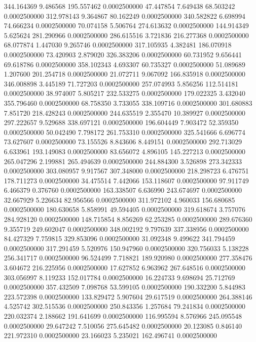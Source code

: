 344.164369 9.486568 195.557462 0.0002500000
47.447854 7.649438 68.503242 0.0002500000
312.978143 9.364867 80.162249 0.0002500000
340.582822 6.698994 74.666234 0.0002500000
70.074158 5.506764 274.613632 0.0002500000
144.914349 5.625624 281.290966 0.0002500000
286.615516 3.721836 216.277368 0.0002500000
68.077874 1.447030 9.265746 0.0002500000
317.105935 4.382481 186.070918 0.0002500000
73.420903 2.879020 326.383206 0.0002500000
60.731952 9.656441 69.618786 0.0002500000
358.102343 4.693307 60.735327 0.0002500000
51.089689 1.207600 201.254718 0.0002500000
21.072711 9.067092 166.835918 0.0002500000
346.008898 3.445189 71.727203 0.0002500000
257.074993 5.856256 112.514181 0.0002500000
38.974007 5.805217 232.533275 0.0002500000
179.022325 3.432040 355.796460 0.0002500000
68.758350 3.733055 338.109716 0.0002500000
301.680883 7.851720 218.428243 0.0002500000
244.635519 2.355470 10.389927 0.0002500000
297.222657 9.529688 338.697121 0.0002500000
196.604449 7.903472 52.359350 0.0002500000
50.042490 7.798172 261.753310 0.0002500000
325.541666 6.696774 73.627607 0.0002500000
73.155526 8.843606 8.449151 0.0002500000
292.713029 6.633961 193.149083 0.0002500000
83.656072 4.896105 145.227213 0.0002500000
265.047296 2.199881 265.494639 0.0002500000
244.884300 3.526898 273.342333 0.0002500000
303.080957 9.917567 307.348000 0.0002500000
218.298723 6.476751 178.711273 0.0002500000
34.475514 7.442066 153.118607 0.0002500000
97.911749 6.466379 0.376760 0.0002500000
163.338507 6.636990 243.674697 0.0002500000
32.667929 5.226634 82.956566 0.0002500000
311.972102 4.960033 156.680685 0.0002500000
180.630658 5.858991 49.594405 0.0002500000
319.618674 3.757076 284.928120 0.0002500000
148.715854 8.856269 62.253285 0.0002500000
289.676360 9.355719 249.602047 0.0002500000
348.002192 9.797639 337.338956 0.0002500000
84.427329 7.759815 329.853096 0.0002500000
31.092348 9.499622 341.794459 0.0002500000
317.291459 5.520976 150.947960 0.0002500000
320.756033 5.138228 256.341717 0.0002500000
96.524499 7.718821 189.920980 0.0002500000
277.358476 3.604672 216.225956 0.0002500000
17.627852 6.963962 267.648516 0.0002500000
303.056997 8.119233 152.017784 0.0002500000
16.224733 9.698694 25.712769 0.0002500000
357.432509 7.098768 53.599105 0.0002500000
190.332200 5.844983 223.572398 0.0002500000
133.829472 5.907604 29.617519 0.0002500000
264.388146 4.525742 302.515536 0.0002500000
250.843356 1.257684 79.241834 0.0002500000
220.032374 2.188662 191.641699 0.0002500000
116.995594 8.576966 245.095548 0.0002500000
29.647242 7.510056 275.645482 0.0002500000
20.123085 0.846140 221.972310 0.0002500000
23.166023 5.235021 162.496741 0.0002500000
